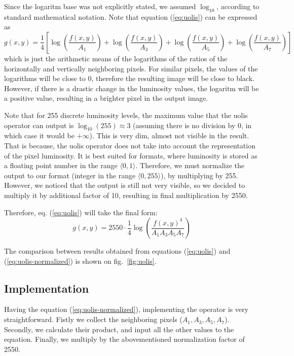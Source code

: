 \documentclass[12pt]{article}
\begin{document}
Since the logaritm base was not explicitly stated, we assumed $\log_{10}$, according to standard mathematical notation.
Note that equation (\ref{eq:uolis}) can be expressed as
\begin{equation*}
    g(x,y) = \frac{1}{4} \left[
        \log\left(\frac{f(x,y)}{A_1}\right) +
        \log\left(\frac{f(x,y)}{A_3}\right) +
        \log\left(\frac{f(x,y)}{A_5}\right) +
        \log\left(\frac{f(x,y)}{A_7}\right)
        \right]
\end{equation*}
which is just the arithmetic means of the logarithms of the ratios of the horizontally and vertically neighboring pixels.
For similar pixels, the values of the logarithms will be close to 0, therefore the resulting image will be close to black.
However, if there is a drastic change in the luminosity values, the logaritm will be a positive value, resulting in a brighter pixel in the output image.

Note that for 255 discrete luminosity levels, the maximum value that the uolis operator can output is $\log_{10}(255) \approx 3$ (assuming there is no division by 0, in which case it would be $+\infty$).
This is very dim, almost not visible in the result.
That is because, the uolis operator does not take into account the representation of the pixel luminosity.
It is best suited for formats, where luminosity is stored as a floating point number in the range $\langle 0, 1 \rangle$.
Therefore, we must normalize the output to our format (integer in the range $\langle 0, 255 \rangle$), by multiplying by 255.
However, we noticed that the output is still not very visible, so we decided to multiply it by additional factor of 10, resulting in final multiplication by 2550.

Therefore, eq. (\ref{eq:uolis}) will take the final form:
\begin{equation}
    g(x,y) = 2550 \cdot \frac{1}{4} \log \left(
    \frac{f(x,y)^4}{A_1 A_3 A_5 A_7}
    \right)
    \label{eq:uolis-normalized}
\end{equation}

The comparison between results obtained from equations (\ref*{eq:uolis}) and (\ref*{eq:uolis-normalized}) is shown on fig.~\ref{fig:uolis}.

\pagebreak[3]
\subsection{Implementation}

Having the equation (\ref{eq:uolis-normalized}), implementing the operator is very straightforward.
Fistly we collect the neighboring pixels ($A_1,A_3,A_5,A_7$).
Secondly, we calculate their product, and input all the other values to the equation.
Finally, we multiply by the abovementioned normalization factor of 2550.
\end{document}
